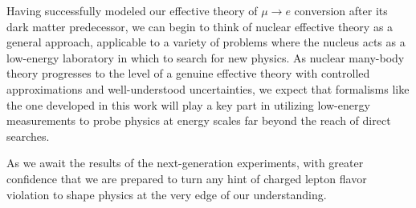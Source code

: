 \documentclass[12pt,letterpaper]{book}
\begin{document}
Having successfully modeled our effective theory of $\mu\rightarrow e$ conversion after its dark matter predecessor, we can begin to think of nuclear effective theory as a general approach, applicable to a variety of problems where the nucleus acts as a low-energy laboratory in which to search for new physics. As nuclear many-body theory progresses to the level of a genuine effective theory with controlled approximations and well-understood uncertainties, we expect that formalisms like the one developed in this work will play a key part in utilizing low-energy measurements to probe physics at energy scales far beyond the reach of direct searches.

As we await the results of the next-generation experiments, with greater confidence that we are prepared to turn any hint of charged lepton flavor violation to shape physics at the very edge of our understanding.

%
%
\cleardoublepage
{}
{}
\printbibliography

\appendix
\end{document}
